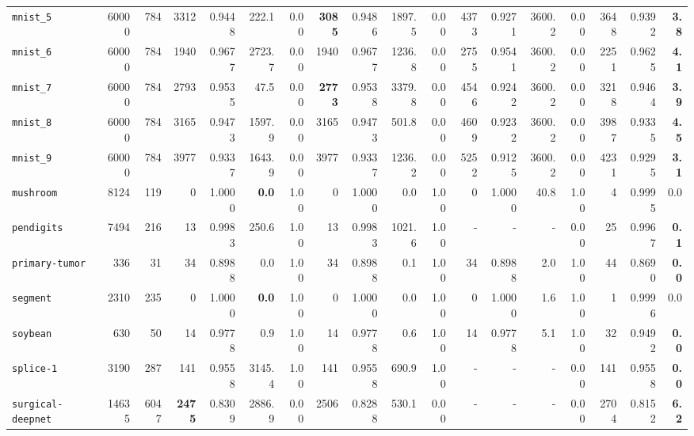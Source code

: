 \begin{tabular}{lccrrrrrrrrrrrrrrr}
\texttt{mnist\_5} & \multicolumn{1}{r}{60000} & \multicolumn{1}{r}{784}  & 3312 & 0.9448 & 222.1 & 0.00 & \textbf{3085} & 0.9486 & 1897.5 & 0.00 & 4373 & 0.9271 & 3600.2 & 0.00 & 3648 & 0.9392 & \textbf{3.8}\\
\texttt{mnist\_6} & \multicolumn{1}{r}{60000} & \multicolumn{1}{r}{784}  & 1940 & 0.9677 & 2723.7 & 0.00 & 1940 & 0.9677 & 1236.8 & 0.00 & 2755 & 0.9541 & 3600.2 & 0.00 & 2251 & 0.9625 & \textbf{4.1}\\
\texttt{mnist\_7} & \multicolumn{1}{r}{60000} & \multicolumn{1}{r}{784}  & 2793 & 0.9535 & 47.5 & 0.00 & \textbf{2773} & 0.9538 & 3379.8 & 0.00 & 4546 & 0.9242 & 3600.2 & 0.00 & 3218 & 0.9464 & \textbf{3.9}\\
\texttt{mnist\_8} & \multicolumn{1}{r}{60000} & \multicolumn{1}{r}{784}  & 3165 & 0.9473 & 1597.9 & 0.00 & 3165 & 0.9473 & 501.8 & 0.00 & 4609 & 0.9232 & 3600.2 & 0.00 & 3987 & 0.9335 & \textbf{4.5}\\
\texttt{mnist\_9} & \multicolumn{1}{r}{60000} & \multicolumn{1}{r}{784}  & 3977 & 0.9337 & 1643.9 & 0.00 & 3977 & 0.9337 & 1236.2 & 0.00 & 5252 & 0.9125 & 3600.2 & 0.00 & 4231 & 0.9295 & \textbf{3.1}\\
\texttt{mushroom} & \multicolumn{1}{r}{8124} & \multicolumn{1}{r}{119}  & 0 & 1.0000 & \textbf{0.0} & 1.00 & 0 & 1.0000 & 0.0 & 1.00 & 0 & 1.0000 & 40.8 & 1.00 & 4 & 0.9995 & 0.0\\
\texttt{pendigits} & \multicolumn{1}{r}{7494} & \multicolumn{1}{r}{216}  & 13 & 0.9983 & 250.6 & 1.00 & 13 & 0.9983 & 1021.6 & 1.00 & - & - & - & 0.00 & 25 & 0.9967 & \textbf{0.1}\\
\texttt{primary-tumor} & \multicolumn{1}{r}{336} & \multicolumn{1}{r}{31}  & 34 & 0.8988 & 0.0 & 1.00 & 34 & 0.8988 & 0.1 & 1.00 & 34 & 0.8988 & 2.0 & 1.00 & 44 & 0.8690 & \textbf{0.0}\\
\texttt{segment} & \multicolumn{1}{r}{2310} & \multicolumn{1}{r}{235}  & 0 & 1.0000 & \textbf{0.0} & 1.00 & 0 & 1.0000 & 0.0 & 1.00 & 0 & 1.0000 & 1.6 & 1.00 & 1 & 0.9996 & 0.0\\
\texttt{soybean} & \multicolumn{1}{r}{630} & \multicolumn{1}{r}{50}  & 14 & 0.9778 & 0.9 & 1.00 & 14 & 0.9778 & 0.6 & 1.00 & 14 & 0.9778 & 5.1 & 1.00 & 32 & 0.9492 & \textbf{0.0}\\
\texttt{splice-1} & \multicolumn{1}{r}{3190} & \multicolumn{1}{r}{287}  & 141 & 0.9558 & 3145.4 & 1.00 & 141 & 0.9558 & 690.9 & 1.00 & - & - & - & 0.00 & 141 & 0.9558 & \textbf{0.0}\\
\texttt{surgical-deepnet} & \multicolumn{1}{r}{14635} & \multicolumn{1}{r}{6047}  & \textbf{2475} & 0.8309 & 2886.9 & 0.00 & 2506 & 0.8288 & 530.1 & 0.00 & - & - & - & 0.00 & 2704 & 0.8152 & \textbf{6.2}\\

\end{tabular}
